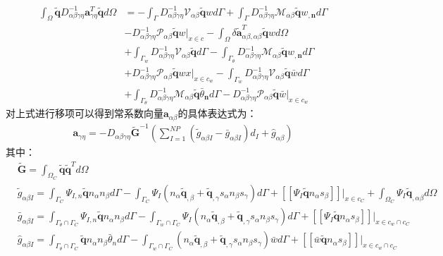 \begin{equation}
\begin{split}
        \int_{\Omega}\tilde{\pmb{q}}D^{-1}_{\alpha\beta\gamma\eta}\pmb{a}_{\gamma\eta}^T\tilde{\pmb{q}}d\Omega&=
        -\int_{\Gamma}D_{\alpha\beta\gamma\eta}^{-1}\mathcal{V}_{\alpha\beta}\tilde{\pmb{q}}wd\Gamma
        +\int_{\Gamma}D_{\alpha\beta\gamma\eta}^{-1}\mathcal{M}_{\alpha\beta}\tilde{\pmb{q}}w_{,\pmb{n}}d\Gamma\\
        &-D_{\alpha\beta\gamma\eta}^{-1}\mathcal{P}_{\alpha\beta}\tilde{\pmb{q}}w\vert_{x\in c}
        -\int_{\Omega}\delta\tilde{\pmb{a}}_{\alpha\beta,\alpha\beta}^T\tilde{\pmb{q}}wd\Omega\\
        &+\int_{\Gamma_w}D_{\alpha\beta\gamma\eta}^{-1}\mathcal{V}_{\alpha\beta}\tilde{\pmb{q}}d\Gamma
        -\int_{\Gamma_{\theta}}D_{\alpha\beta\gamma\eta}^{-1}\mathcal{M}_{\alpha\beta}\tilde{\pmb{q}}w_{,\pmb{n}}d\Gamma\\
        &+D_{\alpha\beta\gamma\eta}^{-1}\mathcal{P}_{\alpha\beta}\tilde{\pmb{q}}wx\vert_{x\in{c_w}}
        -\int_{\Gamma_w}D_{\alpha\beta\gamma\eta}^{-1}\mathcal{V}_{\alpha\beta}\tilde{\pmb{q}}\bar{w}d\Gamma\\
        &+\int_{\Gamma_{\theta}}D_{\alpha\beta\gamma\eta}^{-1}\mathcal{M}_{\alpha\beta}\tilde{\pmb{q}}\bar{\theta}_{\pmb{n}}d\Gamma
        -D_{\alpha\beta\gamma\eta}^{-1}\mathcal{P}_{\alpha\beta}\tilde{\pmb{q}}\bar{w}\vert_{x\in{c_w}}
\end{split}
\end{equation}
对上式进行移项可以得到常系数向量$\pmb{a}_{\alpha\beta}$的具体表达式为：
\begin{equation}\label{aalphabeta}
\begin{split}
    \pmb{a}_{\gamma\eta}=-D_{\alpha\beta\gamma\eta}\tilde{\pmb{G}}^{-1}(\sum_{I=1}^{N\!P}(\tilde{g}_{\alpha\beta I}-\bar{g}_{\alpha\beta I})d_I+\hat{g}_{\alpha\beta})
\end{split}
\end{equation}
其中：
\begin{align}
\label{PG}&\tilde{\pmb{G}}=\int_{\Omega_C}\tilde{\pmb{q}}\tilde{\pmb{q}}^Td\Omega\\
\label{Pg1}&\tilde{g}_{\alpha\beta I}=\int_{\Gamma_C}\Psi_{I,n}\tilde{\pmb{q}}n_{\alpha}n_{\beta}d\Gamma-\int_{\Gamma_C}\Psi_I(n_{\alpha}\tilde{\pmb{q}}_{,\beta}+\tilde{\pmb q}_{,\gamma}s_{\alpha}n_{\beta}s_{\gamma})d\Gamma+[[\Psi_I\tilde{\pmb q}n_{\alpha}s_{\beta}]]\vert_{x\in c_C}+\int_{\Omega_C}\Psi_I\tilde{\pmb{q}}_{,\alpha\beta}d\Omega\\
\label{Pg2}&\bar{g}_{\alpha\beta I}=\int_{{\Gamma_{\theta}}\cap{\Gamma_C}}\Psi_{I,n}\tilde{\pmb{q}}n_{\alpha}n_{\beta}d\Gamma-\int_{{\Gamma_w}\cap{\Gamma_C}}\Psi_I(n_{\alpha}\tilde{\pmb{q}}_{,\beta}+\tilde{\pmb q}_{,\gamma}s_{\alpha}n_{\beta}s_{\gamma})d\Gamma+[[\Psi_I\tilde{\pmb q}n_{\alpha}s_{\beta}]]\vert_{x\in{c_w}\cap{c_C}}\\
\label{Pg3}&\hat{g}_{\alpha\beta I}=\int_{{\Gamma_{\theta}}\cap{\Gamma_C}}\tilde{\pmb{q}}n_{\alpha}n_{\beta}\bar{\theta}_nd\Gamma-\int_{{\Gamma_w}\cap{\Gamma_C}}(n_{\alpha}\tilde{\pmb{q}}_{,\beta}+\tilde{\pmb q}_{,\gamma}s_{\alpha}n_{\beta}s_{\gamma})\bar{w}d\Gamma+[[\bar{w}\tilde{\pmb q}n_{\alpha}s_{\beta}]]\vert_{x\in{c_w}\cap{c_C}}
\end{align}
